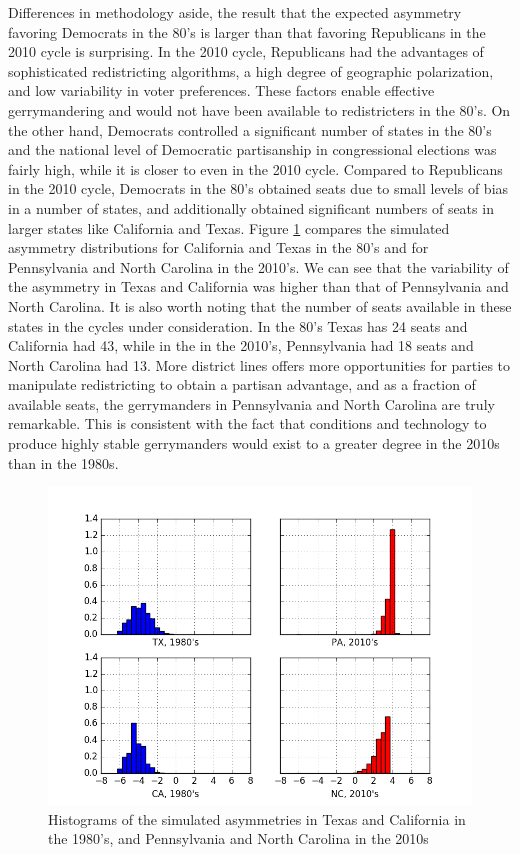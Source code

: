 \documentclass[preprint,12pt]{article}
\begin{document}
Differences in methodology aside, the result that the expected asymmetry favoring Democrats in the 80's is larger than that favoring Republicans in the 2010 cycle is surprising.
In the 2010 cycle, Republicans had the advantages of sophisticated redistricting algorithms, a high degree of geographic polarization, and low variability in voter preferences.
These factors enable effective gerrymandering and would not have been available to redistricters in the 80's.
On the other hand, Democrats controlled a significant number of states in the 80's and the national level of Democratic partisanship in congressional elections was fairly high, while it is closer to even in the 2010 cycle.
Compared to Republicans in the 2010 cycle, Democrats in the 80's obtained seats due to small levels of bias in a number of states, and additionally obtained significant numbers of seats in larger states like California and Texas.
Figure \ref{fig:80vs10} compares the simulated asymmetry distributions for California and Texas in the 80's and for Pennsylvania and North Carolina in the 2010's.
We can see that the variability of the asymmetry in Texas and California was higher than that of Pennsylvania and North Carolina.
It is also worth noting that the number of seats available in these states in the cycles under consideration.
In the 80's Texas has 24 seats and  California had 43, while in the in the 2010's, Pennsylvania had 18 seats and North Carolina had 13.
More district lines offers more opportunities for parties to manipulate redistricting to obtain a partisan advantage, and as a fraction of available seats, the gerrymanders in Pennsylvania and North Carolina are truly remarkable.
This is consistent with the fact that conditions and technology to produce highly stable gerrymanders would exist to a greater degree in the 2010s than in the 1980s.

\begin{figure}[htb!]
    \begin{center}
        \includegraphics[scale=0.8]{../Figures/ExpectedAsymmetry/80vs10.png}
        \caption{Histograms of the simulated asymmetries in Texas and California in the 1980's, and Pennsylvania and North Carolina in the 2010s}\label{fig:80vs10}
    \end{center}
\end{figure}
\end{document}
